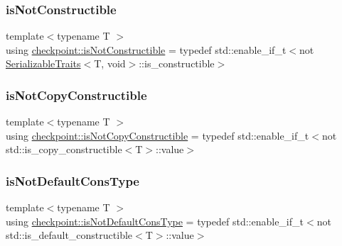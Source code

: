\mbox{\label{namespacecheckpoint_a14b3c81988a2c2d3c935edcc653b6322}} 
\subsubsection{\texorpdfstring{is\+Not\+Constructible}{isNotConstructible}}
{\footnotesize\ttfamily template$<$typename T $>$ \\
using \hyperlink{namespacecheckpoint_a14b3c81988a2c2d3c935edcc653b6322}{checkpoint\+::is\+Not\+Constructible} = typedef std\+::enable\+\_\+if\+\_\+t$<$not \hyperlink{structcheckpoint_1_1_serializable_traits}{Serializable\+Traits}$<$T, void$>$\+::is\+\_\+constructible$>$}

\mbox{\label{namespacecheckpoint_a141a100f9dcca06fb0b6dbf44a5d6756}} 
\subsubsection{\texorpdfstring{is\+Not\+Copy\+Constructible}{isNotCopyConstructible}}
{\footnotesize\ttfamily template$<$typename T $>$ \\
using \hyperlink{namespacecheckpoint_a141a100f9dcca06fb0b6dbf44a5d6756}{checkpoint\+::is\+Not\+Copy\+Constructible} = typedef std\+::enable\+\_\+if\+\_\+t$<$not std\+::is\+\_\+copy\+\_\+constructible$<$T$>$\+::value$>$}

\mbox{\label{namespacecheckpoint_a4032c86e7c92702198dd675a2696ee2c}} 
\subsubsection{\texorpdfstring{is\+Not\+Default\+Cons\+Type}{isNotDefaultConsType}}
{\footnotesize\ttfamily template$<$typename T $>$ \\
using \hyperlink{namespacecheckpoint_a4032c86e7c92702198dd675a2696ee2c}{checkpoint\+::is\+Not\+Default\+Cons\+Type} = typedef std\+::enable\+\_\+if\+\_\+t$<$not std\+::is\+\_\+default\+\_\+constructible$<$T$>$\+::value$>$}


